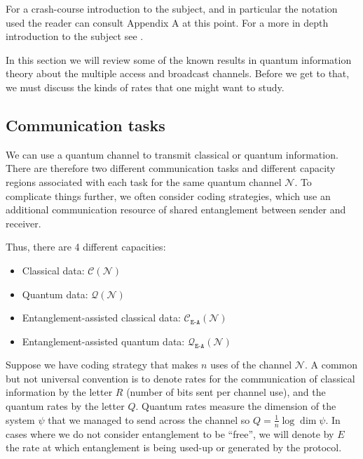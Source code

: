 \documentclass[aps,11pt,twoside,letterpaper]{article}
\begin{document}
	For a crash-course introduction to the subject, and in particular the notation
	used the reader can consult Appendix A at this point.
	For a more in depth introduction to the subject see \cite{NC04}.


	In this section we will review some of the known results in quantum information theory
	about the multiple access and broadcast channels. 
	Before we get to that, we must discuss the kinds of rates that one might want to study.


	\subsection{Communication tasks}
			
		We can use a quantum channel to transmit classical or quantum information.
		There are therefore two different communication tasks and different capacity regions
		associated with each task for the same quantum channel $\mathcal{N}$.
		To complicate things further, we often consider coding strategies, which use an additional
		communication resource of shared entanglement  between sender	and receiver.
		
		Thus, there are 4 different capacities:
		\begin{itemize}
			\item Classical data: $\mathcal{C}\!\left(\mathcal{N}\right)$ \vspace{-0.1in}
			\item Quantum data: $\mathcal{Q}\!\left(\mathcal{N}\right)$ \vspace{-0.1in}
			\item Entanglement-assisted classical data: $\mathcal{C}_{\texttt{E-A}}\!\left(\mathcal{N}\right)$ \vspace{-0.1in}
			\item Entanglement-assisted quantum data: $\mathcal{Q}_{\texttt{E-A}}\!\left(\mathcal{N}\right)$
		\end{itemize}
	
		Suppose we have coding strategy that makes $n$ uses of the channel $\mathcal{N}$.
		A common but not universal convention is to denote rates for the communication
		of classical information by the letter $R$ (number of bits sent per channel use),
		and the quantum rates by the letter $Q$. 
		Quantum rates measure the dimension of the system $\psi$ that we managed
		to send across the channel so $Q=\frac{1}{n}\log \dim \psi$.
		In cases where we do not consider entanglement to be ``free'', we will 
		denote by $E$ the rate at which entanglement is being used-up or generated
		by the protocol.
		
\end{document}
